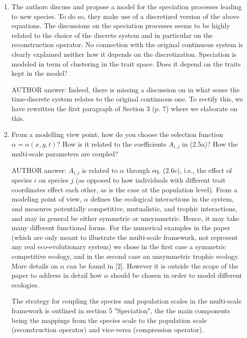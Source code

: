 \documentclass[a4paper,11pt]{scrartcl}
\newcommand{\red}{\textcolor{red}}
\begin{document}
\begin{enumerate}
\item
The authors discuss and propose a model for the speciation processes leading to new species. To do so, they make use of a discretized version of the above equations. The discussions on the speciation processes seems to be highly related to the choice of the discrete system and in particular on the reconstruction operator. No connection with the original continuous system is clearly explained neither how it depends on the discretization.
Speciation is modeled in term of clustering in the trait space. Does it depend on the traits kept in the model?

AUTHOR answer: Indeed, there is missing a discussion on in what sense the time-discrete system relates to the original continuous one. To rectify this, we have rewritten the first paragraph of Section 3 (p. 7) where we elaborate on this.


\item
From a modelling view point, how do you choose the selection function $\alpha=\alpha(x,y,t)$? How is it related to the coefficients $A_{i,j}$ in (2.5a)? How the multi-scale parameters are coupled?

AUTHOR answer: $A_{i,j}$ is related to $\alpha$ through eq. (2.6c), i.e., the effect of species $i$ on species $j$ (as opposed to how individuals with different trait coordinates effect each other, as is the case at the population level). From a modeling point of view, $\alpha$ defines the ecological interactions in the system, and measures potentially competitive, mutualistic, and trophic interactions, and may in general be either symmetric or unsymmetric. Hence, it may take many different functional forms. For the numerical examples in the paper (which are only meant to illustrate the multi-scale framework, not represent any real eco-evolutionary system) we chose in the first case a symmetric competitive ecology, and in the second case an unsymmetric trophic ecology. More details on $\alpha$ can be found in [2]. However it is outside the scope of the paper to address in detail how $\alpha$ should be chosen in order to model different ecologies.

The strategy for coupling the species and population scales in the multi-scale framework is outlined in section 5 "Speciation", the the main components being the mappings from the species scale to the population scale (reconstruction operator) and vice-versa (compression operator).
\end{enumerate}
\end{document}
